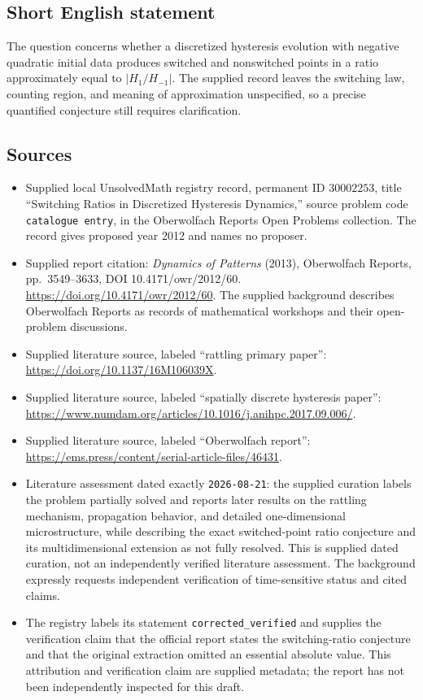 \documentclass[11pt]{article}
\begin{document}
\subsection{Short English statement}
The question concerns whether a discretized hysteresis evolution with negative quadratic initial data produces switched and nonswitched points in a ratio approximately equal to \(\lvert H_1/H_{-1}\rvert\). The supplied record leaves the switching law, counting region, and meaning of approximation unspecified, so a precise quantified conjecture still requires clarification.
\subsection{Sources}
\begin{itemize}
\item Supplied local UnsolvedMath registry record, permanent ID \(30002253\), title ``Switching Ratios in Discretized Hysteresis Dynamics,'' source problem code \texttt{catalogue entry}, in the Oberwolfach Reports Open Problems collection. The record gives proposed year 2012 and names no proposer.
\item Supplied report citation: \emph{Dynamics of Patterns} (2013), Oberwolfach Reports, pp.\ 3549--3633, DOI 10.4171/owr/2012/60. \url{https://doi.org/10.4171/owr/2012/60}. The supplied background describes Oberwolfach Reports as records of mathematical workshops and their open-problem discussions.
\item Supplied literature source, labeled ``rattling primary paper'': \url{https://doi.org/10.1137/16M106039X}.
\item Supplied literature source, labeled ``spatially discrete hysteresis paper'': \url{https://www.numdam.org/articles/10.1016/j.anihpc.2017.09.006/}.
\item Supplied literature source, labeled ``Oberwolfach report'': \url{https://ems.press/content/serial-article-files/46431}.
\item Literature assessment dated exactly \texttt{2026-08-21}: the supplied curation labels the problem partially solved and reports later results on the rattling mechanism, propagation behavior, and detailed one-dimensional microstructure, while describing the exact switched-point ratio conjecture and its multidimensional extension as not fully resolved. This is supplied dated curation, not an independently verified literature assessment. The background expressly requests independent verification of time-sensitive status and cited claims.
\item The registry labels its statement \texttt{corrected\_verified} and supplies the verification claim that the official report states the switching-ratio conjecture and that the original extraction omitted an essential absolute value. This attribution and verification claim are supplied metadata; the report has not been independently inspected for this draft.
\end{itemize}
\end{document}
